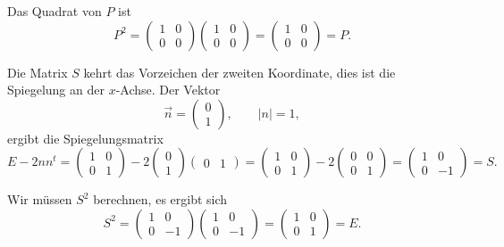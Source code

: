 \begin{loesung}
\begin{teilaufgaben}
\item 
Das Quadrat von $P$ ist
\[
P^2=
\begin{pmatrix}1&0\\0&0\end{pmatrix}
\begin{pmatrix}1&0\\0&0\end{pmatrix}
=
\begin{pmatrix}1&0\\0&0\end{pmatrix}
=
P.
\]
\item
Die Matrix $S$ kehrt das Vorzeichen der zweiten Koordinate, dies ist
die Spiegelung an der $x$-Achse. 
Der Vektor
\[
\vec{n}
=
\begin{pmatrix}0\\1\end{pmatrix},
\qquad
|n| = 1,
\]
ergibt die Spiegelungsmatrix
\[
E-2nn^t
=
\begin{pmatrix}1&0\\0&1\end{pmatrix}
-2\begin{pmatrix}0\\1\end{pmatrix}\begin{pmatrix}0&1\end{pmatrix}
=
\begin{pmatrix}1&0\\0&1\end{pmatrix}
-2
\begin{pmatrix}0&0\\0&1\end{pmatrix}
=
\begin{pmatrix}1&0\\0&-1\end{pmatrix}
=
S.
\]
\item
Wir müssen $S^2$ berechnen, es ergibt sich
\[
S^2
=
\begin{pmatrix}1&0\\0&-1\end{pmatrix}
\begin{pmatrix}1&0\\0&-1\end{pmatrix}
=
\begin{pmatrix}1&0\\0&1\end{pmatrix}
=
E.
\]
\item 

\end{teilaufgaben}
\end{loesung}

